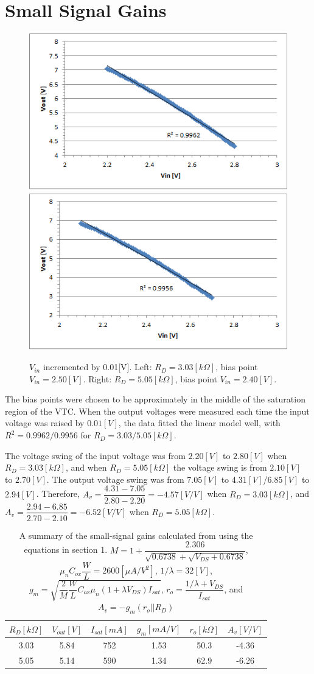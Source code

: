 \documentclass[a4paper, itemph]{oblivoir}
\theoremstyle{definition}
\begin{document}
\section{Small Signal Gains}
\begin{figure}[htb]
    \centering
    \includegraphics[width=0.4\linewidth]{3030_gain.png}
    \includegraphics[width=0.4\linewidth]{5050_gain.png}
    \caption{$V_{in}$ incremented by 0.01[V]. Left: $R_D=3.03[k\Omega]$, bias point $V_{in}=2.50[V]$. Right: $R_D=5.05[k\Omega]$, bias point $V_{in}=2.40[V]$.}
\end{figure}

The bias points were chosen to be approximately in the middle of the saturation region of the VTC. When the output voltages were measured each time the input voltage was raised by $0.01[V]$, the data fitted the linear model well, with $R^2=0.9962/0.9956$ for $R_D=3.03/5.05[k\Omega]$.

The voltage swing of the input voltage was from $2.20[V]$ to $2.80[V]$ when $R_D=3.03[k\Omega]$, and when $R_D=5.05[k\Omega]$ the voltage swing is from $2.10[V]$ to $2.70[V]$. The output voltage swing was from $7.05[V]$ to $4.31[V]$/$6.85[V]$ to $2.94[V]$. Therefore, $A_v=\dfrac{4.31-7.05}{2.80-2.20}=-4.57[V/V]$ when $R_D=3.03[k\Omega]$, and $A_v=\dfrac{2.94-6.85}{2.70-2.10}=-6.52[V/V]$ when $R_D=5.05[k\Omega]$.
\begin{table}[htb]
    \centering
    \begin{tabular}{c|c|c|c|c|c}
        $R_D[k\Omega]$ & $V_{out}[V]$ & $I_{sat}[mA]$ & $g_m[mA/V]$ & $r_o[k\Omega]$ & $A_v[V/V]$\\
        \hline
        3.03 & 5.84 & 752 & 1.53 & 50.3 & -4.36\\
        \hline
        5.05 & 5.14 & 590 & 1.34 & 62.9 & -6.26
    \end{tabular}
    \caption{A summary of the small-signal gains calculated from using the equations in section 1. $M=1+\dfrac{2.306}{\sqrt{0.6738}+\sqrt{V_{DS}+0.6738}}$, $\mu_n C_{ox}\dfrac{W}{L}=2600[\mu A/V^2]$, $1/\lambda = 32[V]$, $g_m=\sqrt{\dfrac{2}{M}\dfrac{W}{L}C_{ox}\mu_n(1+\lambda V_{DS})I_{sat}}$, $r_o=\dfrac{1/\lambda+V_{DS}}{I_{sat}}$, and $A_v=-g_m(r_o||R_D)$}
\end{table}
\end{document}
